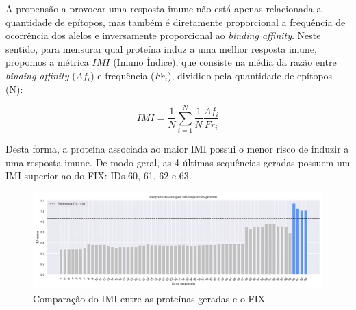 \begin{figure}%
    \centering
    \qquad
\end{figure}

A propensão a provocar uma resposta imune não está apenas relacionada a quantidade de epítopos, 
mas também é diretamente proporcional a frequência de ocorrência dos alelos e inversamente proporcional 
ao \textit{binding affinity}. Neste sentido, para mensurar qual proteína induz a uma melhor resposta imune, propomos a 
métrica $IMI$ (Imuno Índice), que consiste na média da razão entre \textit{binding affinity} (${Af}_{i}$) 
e frequência ($Fr_{i}$), 
dividido pela quantidade de epítopos (N):

\begin{equation}
    IMI = \frac{1}{N} \sum_{i=1}^{N} \frac{1}{N} \frac{{Af}_{i}}{Fr_{i}}
\end{equation}

Desta forma, a proteína associada ao maior IMI possui o menor risco de induzir a uma resposta imune.
De modo geral, as 4 últimas sequências geradas possuem um IMI superior ao do FIX: IDs 60, 61, 62 e 63.

\begin{figure}[H]
    \centering
    \includegraphics[width=.9\linewidth]{figuras/plot_imuno_IMscore_geral.png}    
    \caption{Comparação do IMI entre as proteínas geradas e o FIX}
    \label{fig:immuno_tscore}
\end{figure}

